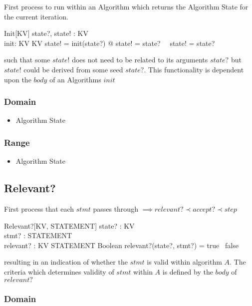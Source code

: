 \documentclass[../main.tex]{subfiles}
\begin{document}
First process to run within an Algorithm which returns the Algorithm State for the current iteration.

\begin{schema}{Init[KV]}
  state?, state! : KV \\
  init: KV \surj KV
  \where
  state! = init(state?) @ state! = state? ~\lor ~state! \not = state?
\end{schema}
such that some $state!$ does not need to be related to its arguments $state?$
but $state!$ could be derived from some seed $state?$.
This functionality is dependent upon the $body$ of an Algorithms $init$

\subsubsection{Domain}

\begin{itemize}
\item Algorithm State
\end{itemize}

\subsubsection{Range}

\begin{itemize}
\item Algorithm State
\end{itemize}

\subsection{Relevant?}

First process that each $stmt$ passes through $\implies relevant? \prec accept? \prec step$
\begin{schema}{Relevant?[KV, STATEMENT]}
  state? : KV \\
  stmt? : STATEMENT \\
  relevant? : KV \cross STATEMENT \fun Boolean
  \where
  relevant?(state?, stmt?) = true ~\lor false
\end{schema}
resulting in an indication of whether the $stmt$ is valid within algorithm $A$.
The criteria which determines validity of $stmt$ within $A$ is defined by the $body$ of $relevant?$

\subsubsection{Domain}
\end{document}
